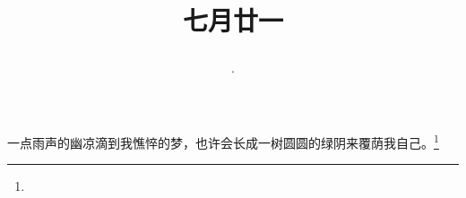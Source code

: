 \title{\date[d=24,m=8,y=2024][year:cn-y,年,month:cn,day:cn,日,·,weekday]·七月廿一 }
一点雨声的幽凉滴到我憔悴的梦，也许会长成一树圆圆的绿阴来覆荫我自己。\footnote{ }


